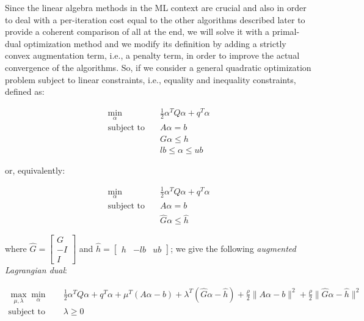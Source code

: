 \bigskip

Since the linear algebra methods in the ML context are crucial and also in order to deal with a per-iteration cost equal to the other algorithms described later to provide a coherent comparison of all at the end, we will solve it with a primal-dual optimization method and we modify its definition by adding a strictly convex augmentation term, i.e., a penalty term, in order to improve the actual convergence of the algorithms. So, if we consider a general quadratic optimization problem subject to linear constraints, i.e., equality and inequality constraints, defined as:

\begin{equation}
    \begin{aligned} 
        \min_{\alpha} \quad & \frac{1}{2} \alpha^T Q \alpha + q^T \alpha \\
            \textrm{subject to} \quad & A \alpha = b \\ & G \alpha \leq h \\ & lb \leq \alpha \leq ub
    \end{aligned}
\end{equation}

or, equivalently:

\begin{equation}
    \begin{aligned}
        \min_{\alpha} \quad & \frac{1}{2} \alpha^T Q \alpha + q^T \alpha \\
            \textrm{subject to} \quad & A \alpha = b \\ & \hat{G} \alpha \leq \hat{h}
    \end{aligned}
\end{equation}

where $\hat{G} =
\begin{bmatrix}
 G \\
-I \\
 I 
\end{bmatrix}$ and $\hat{h} =
\begin{bmatrix}
h & -lb & ub
\end{bmatrix}$; we give the following \emph{augmented Lagrangian dual}:

\begin{equation} \label{eq:l1_svr_gen_aug_lagrangian_dual}
	\begin{aligned}
		    \max_{\mu,\lambda} \min_{\alpha} \quad & \frac{1}{2} \alpha^T Q \alpha + q^T \alpha + \mu^T (A \alpha - b) + \lambda^T (\hat{G} \alpha - \hat{h}) + \frac{\rho}{2} \| A \alpha - b \|^2 + \frac{\rho}{2} \| \hat{G} \alpha - \hat{h} \|^2 \\
    \text{subject to} \quad & \lambda \geq 0
	\end{aligned}
\end{equation}

